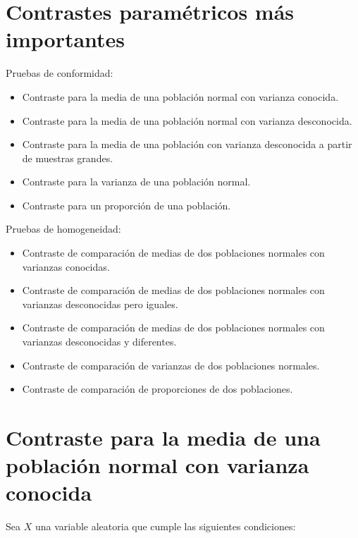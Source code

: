 \documentclass[
  a4paper,
]{scrreport}
\providecommand{\tightlist}{%
  \setlength{\itemsep}{0pt}\setlength{\parskip}{0pt}}\usepackage{longtable,booktabs,array}
\theoremstyle{definition}
\theoremstyle{definition}
\theoremstyle{plain}
\theoremstyle{remark}
\begin{document}
\hypertarget{contrastes-paramuxe9tricos-muxe1s-importantes}{%
\section{Contrastes paramétricos más
importantes}\label{contrastes-paramuxe9tricos-muxe1s-importantes}}

Pruebas de conformidad:

\begin{itemize}
\tightlist
\item
  Contraste para la media de una población normal con varianza conocida.
\item
  Contraste para la media de una población normal con varianza
  desconocida.
\item
  Contraste para la media de una población con varianza desconocida a
  partir de muestras grandes.
\item
  Contraste para la varianza de una población normal.
\item
  Contraste para un proporción de una población.
\end{itemize}

Pruebas de homogeneidad:

\begin{itemize}
\tightlist
\item
  Contraste de comparación de medias de dos poblaciones normales con
  varianzas conocidas.
\item
  Contraste de comparación de medias de dos poblaciones normales con
  varianzas desconocidas pero iguales.
\item
  Contraste de comparación de medias de dos poblaciones normales con
  varianzas desconocidas y diferentes.
\item
  Contraste de comparación de varianzas de dos poblaciones normales.
\item
  Contraste de comparación de proporciones de dos poblaciones.
\end{itemize}

\hypertarget{contraste-para-la-media-de-una-poblaciuxf3n-normal-con-varianza-conocida}{%
\section{Contraste para la media de una población normal con varianza
conocida}\label{contraste-para-la-media-de-una-poblaciuxf3n-normal-con-varianza-conocida}}

Sea \(X\) una variable aleatoria que cumple las siguientes condiciones:
\end{document}
